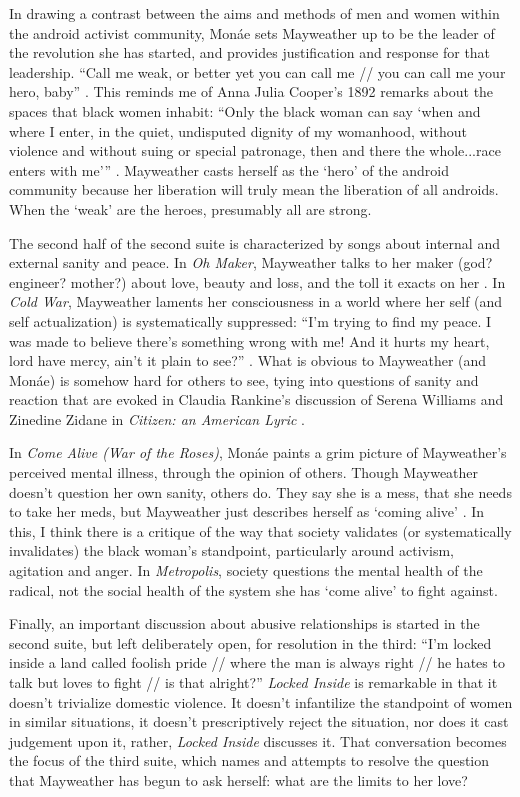 \documentclass[a4paper, 11pt]{article} %
\begin{document}
In drawing a contrast between the aims and methods of men and women within the android activist community, Mon\'ae sets Mayweather up to be the leader of the revolution she has started, and provides justification and response for that leadership.
``Call me weak, or better yet you can call me // you can call me your hero, baby'' .
This reminds me of Anna Julia Cooper's 1892 remarks about the spaces that black women inhabit:
``Only the black woman can say `when and where I enter, in the quiet, undisputed dignity of my womanhood, without violence and without suing or special patronage, then and there the whole...race enters with me''' .
Mayweather casts herself as the `hero' of the android community because her liberation will truly mean the liberation of all androids.
When the `weak' are the heroes, presumably all are strong.

The second half of the second suite is characterized by songs about internal and external sanity and peace.
In \emph{Oh Maker}, Mayweather talks to her maker (god? engineer? mother?) about love, beauty and loss, and the toll it exacts on her .
In \emph{Cold War}, Mayweather laments her consciousness in a world where her self (and self actualization) is systematically suppressed:
``I'm trying to find my peace.  I was made to believe there's something wrong with me! And it hurts my heart, lord have mercy, ain't it plain to see?'' .
What is obvious to Mayweather (and Mon\'ae) is somehow hard for others to see, tying into questions of sanity and reaction that are evoked in Claudia Rankine's discussion of Serena Williams and Zinedine Zidane in \emph{Citizen: an American Lyric} .

In \emph{Come Alive (War of the Roses)}, Mon\'ae paints a grim picture of Mayweather's perceived mental illness, through the opinion of others.
Though Mayweather doesn't question her own sanity, others do.  
They say she is a mess, that she needs to take her meds, but Mayweather just describes herself as `coming alive' .
In this, I think there is a critique of the way that society validates (or systematically invalidates) the black woman's standpoint, particularly around activism, agitation and anger.
In \emph{Metropolis}, society questions the mental health of the radical, not the social health of the system she has `come alive' to fight against.

Finally, an important discussion about abusive relationships is started in the second suite, but left deliberately open, for resolution in the third:
``I'm locked inside a land called foolish pride // where the man is always right // he hates to talk but loves to fight // is that alright?'' 
\emph{Locked Inside} is remarkable in that it doesn't trivialize domestic violence. 
It doesn't infantilize the standpoint of women in similar situations, it doesn't prescriptively reject the situation, nor does it cast judgement upon it, rather, \emph{Locked Inside} discusses it.
That conversation becomes the focus of the third suite, which names and attempts to resolve the question that Mayweather has begun to ask herself:
what are the limits to her love?
\end{document}

